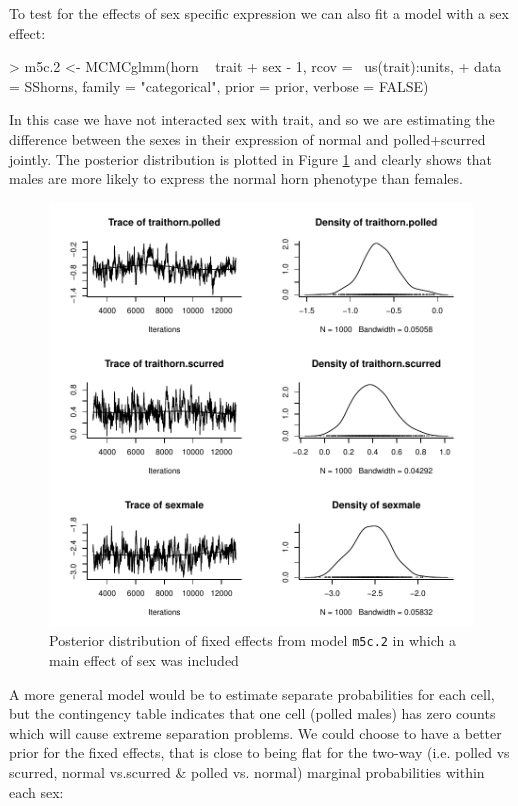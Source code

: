 \documentclass{article}
\begin{document}
To test for the effects of sex specific expression we can also fit a model with a sex effect:

\begin{Schunk}
\begin{Sinput}
> m5c.2 <- MCMCglmm(horn ~ trait + sex - 1, rcov = ~us(trait):units, 
+     data = SShorns, family = "categorical", prior = prior, verbose = FALSE)
\end{Sinput}
\end{Schunk}

In this case we have not interacted sex with trait, and so we are estimating the difference between the sexes in their expression of normal and polled+scurred jointly. The posterior distribution is plotted in Figure \ref{MN2} and clearly shows that males are more likely to express the normal horn phenotype than females.


\begin{figure}[!h]
\begin{center}
\includegraphics{Lecture5-029}
\end{center}
\caption{Posterior distribution of fixed effects from model \texttt{m5c.2} in which a main effect of sex was included}
\label{MN2}
\end{figure}

A more general model would be to estimate separate probabilities for each cell, but the contingency table indicates that one cell (polled males) has zero counts which will cause extreme separation problems. We could choose to have a better prior for the fixed effects, that is close to being flat for the two-way (i.e. polled vs scurred, normal vs.scurred \& polled vs. normal) marginal probabilities within each sex:
\end{document}
